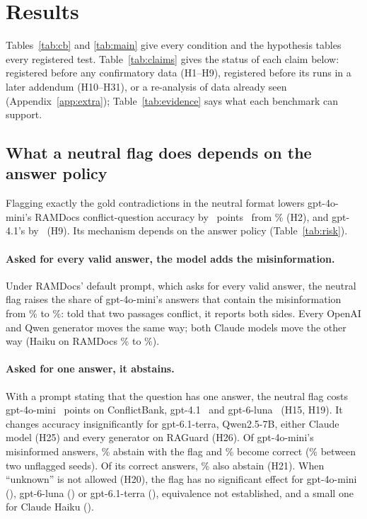 \section{Results}
\label{sec:results}

Tables~\ref{tab:cb} and \ref{tab:main} give every condition and the hypothesis tables every registered test.
Table~\ref{tab:claims} gives the status of each claim below: registered before any confirmatory data (H1--H9), registered before its
runs in a later addendum (H10--H31), or a re-analysis of data already seen (Appendix~\ref{app:extra});
Table~\ref{tab:evidence} says what each benchmark can support.

\subsection{What a neutral flag does depends on the answer policy}
\label{sec:neutral}


Flagging exactly the gold contradictions in the neutral format lowers gpt-4o-mini's RAMDocs conflict-question accuracy
by \adOracleFlagConf\ points \dOracleFlagConfCI\ from \plainConf\% (H2), and gpt-4.1's by \agptOracleFlagConf\ (H9).
Its mechanism depends on the answer policy (Table~\ref{tab:risk}).

\paragraph{Asked for every valid answer, the model adds the misinformation.} Under RAMDocs' default prompt, which asks
for every valid answer, the neutral flag raises the share of gpt-4o-mini's
answers that contain the misinformation from \zmRdMiniPlainWrong\% to \zmRdMiniOracleFlagWrong\%: told that two
passages conflict, it reports both sides. Every OpenAI and Qwen generator moves the same way; both Claude models move
the other way (Haiku on RAMDocs \zmRdHaikuPlainWrong\% to \zmRdHaikuOracleFlagWrong\%).

\paragraph{Asked for one answer, it abstains.} With a prompt stating that the question has one answer, the neutral
flag costs gpt-4o-mini \azSgMiniOracleFlagConflict\ points on ConflictBank, gpt-4.1 \azSgFourOracleFlagConflict\ and
gpt-6-luna \azSgLunaOracleFlagConflict\ (H15, H19). It changes accuracy insignificantly for gpt-6.1-terra,
Qwen2.5-7B, either Claude model (H25) and every generator on RAGuard (H26). Of gpt-4o-mini's misinformed answers, \trSgMiniNeutralMisinfoAbstain\% abstain with the flag and
\trSgMiniNeutralMisinfoCorrect\% become correct (\trNullSgMiniMisinfoCorrect\% between two unflagged seeds). Of its
correct answers, \trSgMiniNeutralCorrectAbstain\% also abstain (H21). When ``unknown'' is not allowed (H20), the flag has no
significant effect for gpt-4o-mini (\hTwentyFcMiniFlag), gpt-6-luna (\hTwentyFcLunaFlag) or gpt-6.1-terra
(\hTwentyFcTerraFlag), equivalence not established, and a small one for Claude Haiku (\hTwentyFcHaikuFlag).

